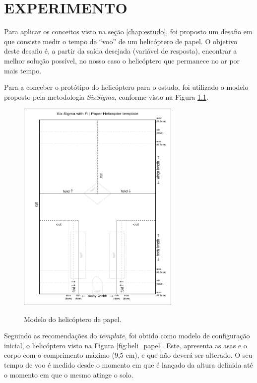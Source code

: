 \chapter{EXPERIMENTO}
\label{chap:experimento}

Para aplicar os conceitos visto na seção \ref{chap:estudo}, foi proposto um desafio em que consiste medir o tempo de ``voo'' de um helicóptero de papel. O objetivo deste desafio é, a partir da saída desejada (variável de resposta), encontrar a melhor solução possível, no nosso caso o helicóptero que permanece no ar por mais tempo.  


Para a conceber o protótipo do helicóptero para o estudo, foi utilizado o modelo proposto pela metodologia \textit{SixSigma}, conforme visto na Figura \ref{fig:model_heli}. 

\begin{figure}[H]
  \caption{Modelo do helicóptero de papel.}
  \centering
  \includegraphics[width=0.7\textwidth]{images/helicopter.jpeg}
  \label{fig:model_heli}
\end{figure}

Seguindo as recomendações do \textit{template}, foi obtido como modelo de configuração inicial, o helicóptero visto na Figura \ref{fig:heli_papel}. Este, apresenta as asas e o corpo com o comprimento máximo (9,5 cm), e que não deverá ser alterado. O seu tempo de voo é medido desde o momento em que é lançado da altura definida até o momento em que o mesmo atinge o solo.

